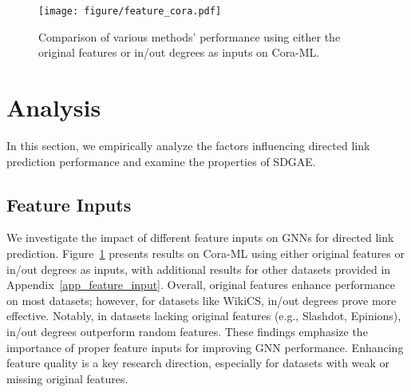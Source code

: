 
\begin{figure}[ht]
    \centering
   \texttt{[image: figure/feature\_cora.pdf]}
   \vspace{-8mm}
   \caption{Comparison of various methods' performance using either the original features or in/out degrees as inputs on Cora-ML.}
   \vspace{-1mm}
    \label{fig:feature_cora}
 \end{figure}

 




 
\section{Analysis}\label{analysis}
In this section, we empirically analyze the factors influencing directed link prediction performance and examine the properties of SDGAE.


\subsection{Feature Inputs}
We investigate the impact of different feature inputs on GNNs for directed link prediction. Figure~\ref{fig:feature_cora} presents results on Cora-ML using either original features or in/out degrees as inputs, with additional results for other datasets provided in Appendix~\ref{app_feature_input}. Overall, original features enhance performance on most datasets; however, for datasets like WikiCS, in/out degrees prove more effective. Notably, in datasets lacking original features (e.g., Slashdot, Epinions), in/out degrees outperform random features. 
These findings emphasize the importance of proper feature inputs for improving GNN performance. Enhancing feature quality is a key research direction, especially for datasets with weak or missing original features.


